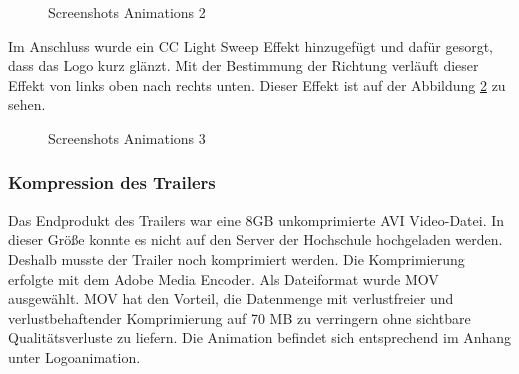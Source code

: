 \begin{figure}[h]
\centering
\qquad
\qquad
\caption{Screenshots Animations 2}%
 \label{fig:Screenshots Animations 2}%
\end{figure}
Im Anschluss wurde ein CC Light Sweep Effekt hinzugefügt und dafür gesorgt, dass das Logo kurz glänzt. Mit der Bestimmung der Richtung verläuft dieser Effekt von links oben nach rechts unten. Dieser Effekt ist auf der Abbildung \ref{fig:Screenshots Animations 3} zu sehen.

\begin{figure}[h]
\centering
\qquad
\qquad
\caption{Screenshots Animations 3}%
 \label{fig:Screenshots Animations 3}%
\end{figure}

\subsubsection{Kompression des Trailers}
Das Endprodukt des Trailers war eine 8GB unkomprimierte AVI Video-Datei. In dieser Größe konnte es nicht auf den Server der Hochschule hochgeladen werden. Deshalb musste der Trailer noch komprimiert werden. Die Komprimierung erfolgte mit dem Adobe Media Encoder. Als Dateiformat wurde MOV ausgewählt. MOV hat den Vorteil, die Datenmenge mit verlustfreier und verlustbehaftender Komprimierung auf 70 MB zu verringern ohne sichtbare Qualitätsverluste zu liefern.
Die Animation befindet sich entsprechend im Anhang unter Logoanimation.

